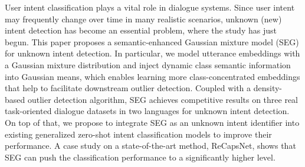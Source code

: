 User intent classification plays a vital role in dialogue systems. Since user intent may frequently change over time in many realistic scenarios, unknown (new) intent detection has become an essential problem, where the study has just begun. This paper proposes a semantic-enhanced Gaussian mixture model (SEG) for unknown intent detection. In particular, we model utterance embeddings with a Gaussian mixture distribution and inject dynamic class semantic information into Gaussian means, which enables learning more class-concentrated embeddings that help to facilitate downstream outlier detection. Coupled with a density-based outlier detection algorithm, SEG achieves competitive results on three real task-oriented dialogue datasets in two languages for unknown intent detection. On top of that, we propose to integrate SEG as an unknown intent identifier into existing generalized zero-shot intent classification models to improve their performance. A case study on a state-of-the-art method, ReCapsNet, shows that SEG can push the classification performance to a significantly higher level.
